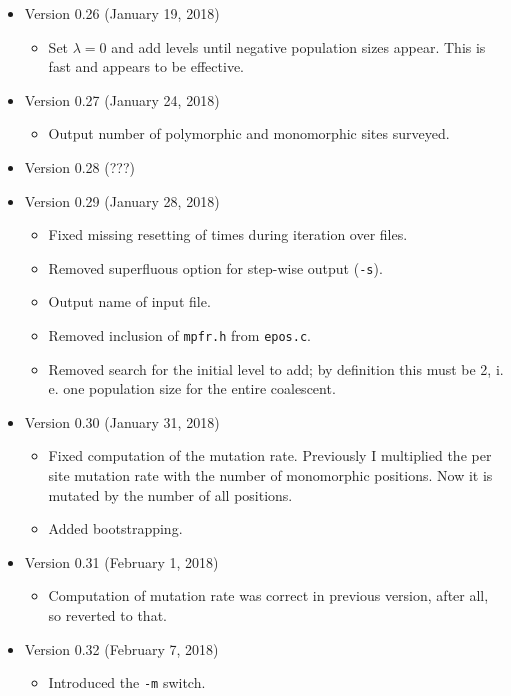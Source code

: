 \documentclass[a4paper, english]{article}
\newcommand{\ty}{\texttt}
\begin{document}
\begin{itemize}
\item Version 0.26 (January 19, 2018)
  \begin{itemize}
  \item Set $\lambda=0$ and add levels until negative population sizes
    appear. This is fast and appears to be effective.
  \end{itemize}
\item Version 0.27 (January 24, 2018)
  \begin{itemize}
  \item Output number of polymorphic and monomorphic sites surveyed.
  \end{itemize}
\item Version 0.28 (???)
\item Version 0.29 (January 28, 2018)
  \begin{itemize}
  \item Fixed missing resetting of times during iteration over files.
  \item Removed superfluous option for step-wise output (\ty{-s}).
  \item Output name of input file.
  \item Removed inclusion of \ty{mpfr.h} from \ty{epos.c}.
  \item Removed search for the initial level to add; by definition
    this must be 2, i. e. one population size for the entire coalescent.
  \end{itemize}
\item Version 0.30 (January 31, 2018)
  \begin{itemize}
  \item Fixed computation of the mutation rate. Previously I
    multiplied the per site mutation rate with the number of
    monomorphic positions. Now it is mutated by the number of all
    positions.
  \item Added bootstrapping.
  \end{itemize}
\item Version 0.31 (February 1, 2018)
  \begin{itemize}
    \item Computation of mutation rate was correct in previous
      version, after all, so reverted to that.
  \end{itemize}
\item Version 0.32 (February 7, 2018)
  \begin{itemize}
    \item Introduced the \ty{-m} switch.
  \end{itemize}

\end{itemize}
\end{document}
